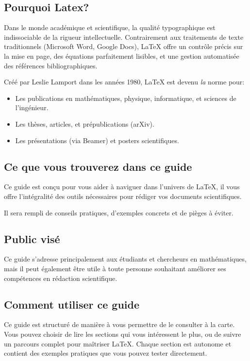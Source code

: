 \subsection*{Pourquoi Latex?}\label{subsec:why_latex}

Dans le monde académique et scientifique, la qualité typographique est indissociable de la rigueur intellectuelle. 
Contrairement aux traitements de texte traditionnels (Microsoft Word, Google Docs), 
LaTeX offre un contrôle précis sur la mise en page, des équations parfaitement lisibles, 
et une gestion automatisée des références bibliographiques.

Créé par Leslie Lamport dans les années 1980, LaTeX est devenu \emph{la} norme pour:

\begin{itemize}
    \item Les publications en mathématiques, physique, informatique, et sciences de l’ingénieur.
    \item Les thèses, articles, et prépublications (arXiv).
    \item Les présentations (via Beamer) et posters scientifiques.
\end{itemize}

\subsection*{Ce que vous trouverez dans ce guide}\label{subsec:what_you_will_find}

Ce guide est conçu pour vous aider à naviguer dans l'univers de LaTeX,
il vous offre l'intégralité des outils nécessaires pour rédiger vos documents scientifiques.

Il sera rempli de conseils pratiques, d'exemples concrets et de pièges à éviter.

\subsection*{Public visé}\label{subsec:target_audience}

Ce guide s'adresse principalement aux étudiants et chercheurs en mathématiques,
mais il peut également être utile à toute personne souhaitant améliorer ses compétences en rédaction scientifique.

\subsection*{Comment utiliser ce guide}\label{subsec:how_to_use_this_guide}

Ce guide est structuré de manière à vous permettre de le consulter à la carte.
Vous pouvez choisir de lire les sections qui vous intéressent le plus,
ou de suivre un parcours complet pour maîtriser LaTeX.
Chaque section est autonome et contient des exemples pratiques que vous pouvez tester directement.